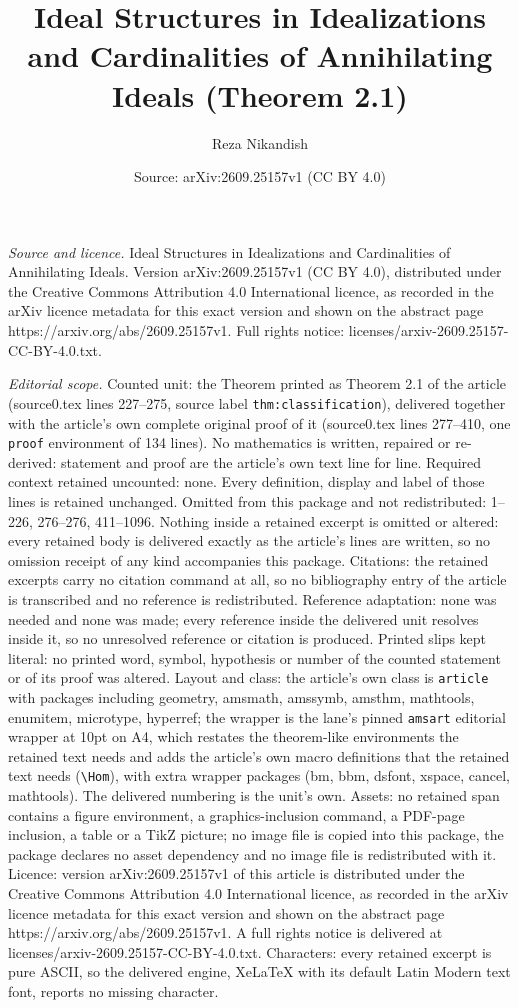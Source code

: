 \documentclass[10pt,a4paper]{amsart}
\title[Ideal Structures in Idealizations and Cardinalities of Annih]{Ideal Structures in Idealizations and Cardinalities of Annihilating Ideals (Theorem 2.1)}
\author{Reza Nikandish}
\date{Source: arXiv:2609.25157v1 (CC BY 4.0)}
\begin{document}
\maketitle

\noindent\emph{Source and licence.} Ideal Structures in Idealizations and Cardinalities of Annihilating Ideals. Version arXiv:2609.25157v1 (CC BY 4.0), distributed under the Creative Commons Attribution 4.0 International licence, as recorded in the arXiv licence metadata for this exact version and shown on the abstract page https://arxiv.org/abs/2609.25157v1. Full rights notice: licenses/arxiv-2609.25157-CC-BY-4.0.txt.\par\smallskip

\noindent\textit{Editorial scope.} Counted unit: the Theorem printed as Theorem 2.1 of the article (source0.tex lines 227--275, source label \texttt{thm:classification}), delivered together with the article's own complete original proof of it (source0.tex lines 277--410, one \texttt{proof} environment of 134 lines). No mathematics is written, repaired or re-derived: statement and proof are the article's own text line for line. Required context retained uncounted: none. Every definition, display and label of those lines is retained unchanged. Omitted from this package and not redistributed: 1--226, 276--276, 411--1096. Nothing inside a retained excerpt is omitted or altered: every retained body is delivered exactly as the article's lines are written, so no omission receipt of any kind accompanies this package. Citations: the retained excerpts carry no citation command at all, so no bibliography entry of the article is transcribed and no reference is redistributed. Reference adaptation: none was needed and none was made; every reference inside the delivered unit resolves inside it, so no unresolved reference or citation is produced. Printed slips kept literal: no printed word, symbol, hypothesis or number of the counted statement or of its proof was altered. Layout and class: the article's own class is \texttt{article} with packages including geometry, amsmath, amssymb, amsthm, mathtools, enumitem, microtype, hyperref; the wrapper is the lane's pinned \texttt{amsart} editorial wrapper at 10pt on A4, which restates the theorem-like environments the retained text needs and adds the article's own macro definitions that the retained text needs (\texttt{\textbackslash Hom}), with extra wrapper packages (bm, bbm, dsfont, xspace, cancel, mathtools). The delivered numbering is the unit's own. Assets: no retained span contains a figure environment, a graphics-inclusion command, a PDF-page inclusion, a table or a TikZ picture; no image file is copied into this package, the package declares no asset dependency and no image file is redistributed with it. Licence: version arXiv:2609.25157v1 of this article is distributed under the Creative Commons Attribution 4.0 International licence, as recorded in the arXiv licence metadata for this exact version and shown on the abstract page https://arxiv.org/abs/2609.25157v1. A full rights notice is delivered at licenses/arxiv-2609.25157-CC-BY-4.0.txt. Characters: every retained excerpt is pure ASCII, so the delivered engine, XeLaTeX with its default Latin Modern text font, reports no missing character.
\end{document}
